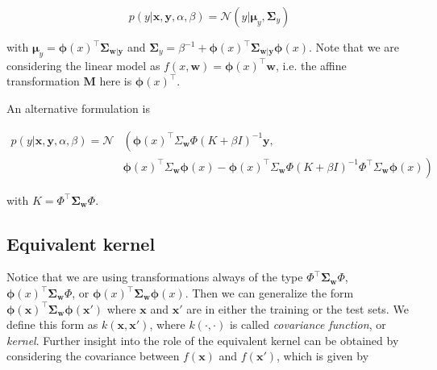 \documentclass[11pt]{article} %
\begin{document}
\begin{equation}
   p(y | \mathbf{x}, \mathbf{y}, \alpha, \beta)=\mathcal{N}\left(y | \boldsymbol{\mu}_{y}, \boldsymbol{\Sigma}_{y} \right)
\end{equation}

with $\boldsymbol{\mu}_y = \boldsymbol{\phi}(x)^\top \boldsymbol{\Sigma}_{\mathbf{w} | \mathbf{y}}$ and $\boldsymbol{\Sigma}_y = \beta^{-1} + \boldsymbol{\phi}(x)^\top \boldsymbol{\Sigma}_{\mathbf{w} | \mathbf{y}}\boldsymbol{\phi}(x)$. Note that we are considering the linear model as $f(x,\mathbf{w}) = \boldsymbol{\phi}(x)^\top \mathbf{w}$, i.e. the affine transformation $\mathbf{M}$ here is $\boldsymbol{\phi}(x)^\top$.

An alternative formulation \cite{Rasmussen:2005:GPM:1162254} is

\begin{equation}
\begin{aligned}
      p(y | \mathbf{x}, \mathbf{y}, \alpha, \beta) = \mathcal{N} & \left(  \boldsymbol{\phi}(x)^{\top} \Sigma_\mathbf{w} \Phi\left(K+\beta I\right)^{-1} \mathbf{y} \right., \\ &\left.\boldsymbol{\phi}(x)^{\top} \Sigma_\mathbf{w} \boldsymbol{\phi}(x)-\boldsymbol{\phi}(x)^{\top} \Sigma_\mathbf{w} \Phi\left(K+\beta I\right)^{-1} \Phi^{\top} \Sigma_\mathbf{w} \boldsymbol{\phi}(x)\right)
\end{aligned}
\end{equation}

with $K=\Phi^{\top} \boldsymbol{\Sigma}_\mathbf{w} \Phi$.

\subsection{Equivalent kernel}

Notice that we are using transformations always of the type $\Phi^{\top} \boldsymbol{\Sigma}_\mathbf{w} \Phi$, $\boldsymbol{\phi}(x)^{\top} \boldsymbol{\Sigma}_\mathbf{w} \Phi$, or $\boldsymbol{\phi}(x)^{\top} \boldsymbol{\Sigma}_\mathbf{w} \boldsymbol{\phi}(x)$. Then we can generalize the form $\boldsymbol{\phi}(\mathbf{x})^\top \boldsymbol{\Sigma}_\mathbf{w}\boldsymbol{\phi}(\mathbf{x'})$ where $\mathbf{x}$ and $\mathbf{x'}$ are in either the training or the test sets. We define this form as $k(\mathbf{x},\mathbf{x'})$, where $k(\cdot,\cdot)$ is called \textit{covariance function}, or \textit{kernel}. Further insight into the role of the equivalent kernel can be obtained by considering the covariance between $f(\mathbf{x})$ and $f(\mathbf{x'})$, which is given by
\end{document}
